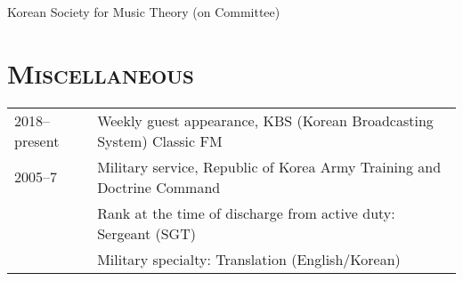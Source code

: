 \documentclass[letter,11pt,draft]{article}
\begin{document}
  \noindent Korean Society for Music Theory (on Committee)
  
  \vspace{2.5mm}
  
  \section*{\textsc{Miscellaneous}}
  
  \hspace*{-0.25cm}
  \begin{tabular}{p{2.5cm} l}
    2018–present & Weekly guest appearance, KBS (Korean Broadcasting System)
    Classic FM\\
    
    2005–7 & Military service, Republic of Korea Army Training and Doctrine
    Command\\
    & Rank at the time of discharge from active duty: Sergeant (SGT)\\
    & Military specialty: Translation (English/Korean)
  \end{tabular}
\end{document}
